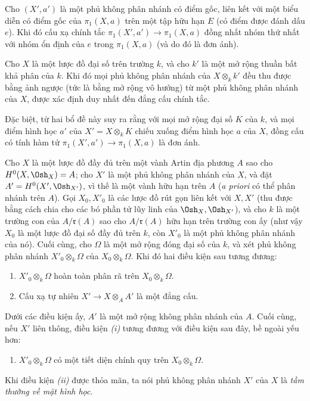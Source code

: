  Cho $(X',a')$ là một phủ không phân nhánh có điểm gốc, liên
kết với một biểu diễn có điểm gốc của $\pi_1(X,a)$ trên một tập hữu hạn $E$
(có điểm được đánh dấu $e$). Khi đó cấu xạ chính tắc
$\pi_1(X',a')\longrightarrow\pi_1(X,a)$ đồng nhất nhóm thứ nhất với nhóm ổn
định của $e$ trong $\pi_1(X,a)$ (và do đó là đơn ánh).

 Cho $X$ là một lược đồ đại số trên trường $k$, và cho $k'$
là một mở rộng thuần bất khả phân của $k$. Khi đó mọi phủ không phân nhánh của
$X\otimes_k k'$ đều thu được bằng ảnh ngược (tức là bằng mở rộng vô hướng) từ
một phủ không phân nhánh của $X$, được xác định duy nhất đến đẳng cấu chính
tắc.

Đặc biệt, từ hai bổ đề này suy ra rằng với mọi mở rộng đại số $K$ của $k$, và
mọi điểm hình học $a'$ của $X'=X\otimes_k K$ chiếu xuống điểm hình học $a$ của
$X$, đồng cấu có tính hàm tử
$\pi_1(X',a')\longrightarrow\pi_1(X,a)$ là đơn ánh.

 Cho $X$ là một lược đồ đầy đủ trên một vành Artin địa phương
$A$ sao cho $H^0(X,\Osh_X)=A$; cho $X'$ là một phủ không phân nhánh của $X$,
và đặt $A'=H^0(X',\Osh_{X'})$, vì thế là một vành hữu hạn trên $A$
(\textit{a priori} có thể phân nhánh trên $A$). Gọi $X_0,X'_0$ là các lược đồ
rút gọn liên kết với $X,X'$ (thu được bằng cách chia cho các bó phần tử lũy
linh của $\Osh_X,\Osh_{X'}$), và cho $k$ là một trường con của
$A/\mathfrak r(A)$ sao cho $A/\mathfrak r(A)$ hữu hạn trên trường con ấy (như vậy
$X_0$ là một lược đồ đại số đầy đủ trên $k$, còn $X'_0$ là một phủ không phân
nhánh của nó). Cuối cùng, cho $\Omega$ là một mở rộng đóng đại số của $k$, và
xét phủ không phân nhánh $X'_0\otimes_k\Omega$ của
$X_0\otimes_k\Omega$. Khi đó hai điều kiện sau tương đương:
\begin{enumerate}
  \item[\textit{i.}] $X'_0\otimes_k\Omega$ hoàn toàn phân rã trên
    $X_0\otimes_k\Omega$.
  \item[\textit{ii.}] Cấu xạ tự nhiên
    $X'\longrightarrow X\otimes_A A'$ là một đẳng cấu.
\end{enumerate}
Dưới các điều kiện ấy, $A'$ là một mở rộng không phân nhánh của $A$. Cuối
cùng, nếu $X'$ liên thông, điều kiện \textit{(i)} tương đương với điều kiện
sau đây, bề ngoài yếu hơn:
\begin{enumerate}
  \item[\textit{i bis.}] $X'_0\otimes_k\Omega$ có một tiết diện chính quy
    trên $X_0\otimes_k\Omega$.
\end{enumerate}
Khi điều kiện \textit{(ii)} được thỏa mãn, ta nói phủ không phân nhánh $X'$
của $X$ là \emph{tầm thường về mặt hình học}.

